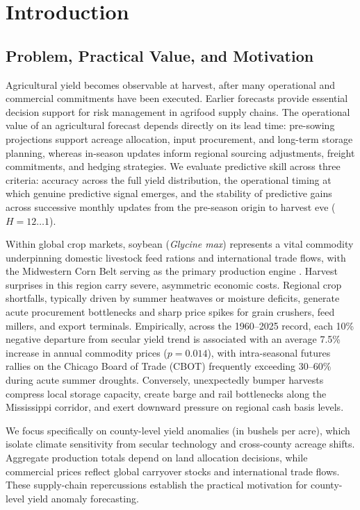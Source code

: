 \chapter{Introduction}
\label{chap:introduction}

\section{Problem, Practical Value, and Motivation}
\label{sec:intro_problem}

Agricultural yield becomes observable at harvest, after many operational and commercial commitments have been executed. Earlier forecasts provide essential decision support for risk management in agrifood supply chains. The operational value of an agricultural forecast depends directly on its lead time: pre-sowing projections support acreage allocation, input procurement, and long-term storage planning, whereas in-season updates inform regional sourcing adjustments, freight commitments, and hedging strategies. We evaluate predictive skill across three criteria: accuracy across the full yield distribution, the operational timing at which genuine predictive signal emerges, and the stability of predictive gains across successive monthly updates from the pre-season origin to harvest eve ($H=12 \dots 1$).

Within global crop markets, soybean (\textit{Glycine max}) represents a vital commodity underpinning domestic livestock feed rations and international trade flows, with the Midwestern Corn Belt serving as the primary production engine \citep{Schlenker2009}. Harvest surprises in this region carry severe, asymmetric economic costs. Regional crop shortfalls, typically driven by summer heatwaves or moisture deficits, generate acute procurement bottlenecks and sharp price spikes for grain crushers, feed millers, and export terminals. Empirically, across the 1960--2025 record, each 10\% negative departure from secular yield trend is associated with an average 7.5\% increase in annual commodity prices ($p = 0.014$), with intra-seasonal futures rallies on the Chicago Board of Trade (CBOT) frequently exceeding 30--60\% during acute summer droughts. Conversely, unexpectedly bumper harvests compress local storage capacity, create barge and rail bottlenecks along the Mississippi corridor, and exert downward pressure on regional cash basis levels.

We focus specifically on county-level yield anomalies (in bushels per acre), which isolate climate sensitivity from secular technology and cross-county acreage shifts. Aggregate production totals depend on land allocation decisions, while commercial prices reflect global carryover stocks and international trade flows. These supply-chain repercussions establish the practical motivation for county-level yield anomaly forecasting.

